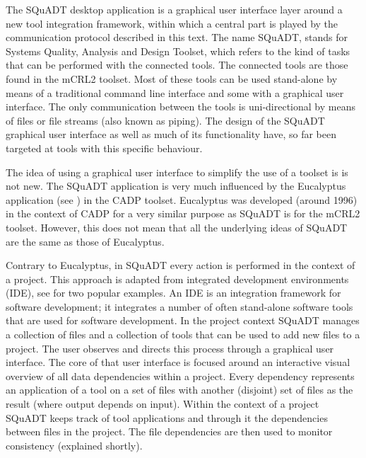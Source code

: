 \documentclass{article}
\newcommand{\squadt}{SQuADT\xspace}
\begin{document}
  The \squadt desktop application is a graphical user interface layer around a
  new tool integration framework, within which a central part is played by the
  communication protocol described in this text.  The name \squadt, stands for
  Systems Quality, Analysis and Design Toolset, which refers to the kind of
  tasks that can be performed with the connected tools. The connected tools are
  those found in the mCRL2 toolset. Most of these tools can be used
  stand-alone by means of a traditional command line interface and some with a
  graphical user interface.  The only communication between the tools is
  uni-directional by means of files or file streams (also known as piping). The
  design of the \squadt graphical user interface as well as much of its
  functionality have, so far been targeted at tools with this specific
  behaviour.

  The idea of using a graphical user interface to simplify the use of a toolset
  is is not new. The \squadt application is very much influenced by the
  Eucalyptus application (see \cite{CADP}) in the CADP toolset. Eucalyptus was
  developed (around 1996) in the context of CADP for a very similar purpose as
  \squadt is for the mCRL2 toolset. However, this does not mean that all the
  underlying ideas of \squadt are the same as those of Eucalyptus.


  Contrary to Eucalyptus, in \squadt every action is performed in the context
  of a project. This approach is adapted from integrated development
  environments (IDE), see \cite{Eclipse,NetBeans} for two popular examples.
  An IDE is an integration framework for software development; it integrates a
  number of often stand-alone software tools that are used for software
  development. In the project context \squadt manages a collection of files and
  a collection of tools that can be used to add new files to a project. The
  user observes and directs this process through a graphical user interface.
  The core of that user interface is focused around an interactive visual
  overview of all data dependencies within a project.  Every dependency
  represents an application of a tool on a set of files with another (disjoint)
  set of files as the result (where output depends on input).  Within the
  context of a project \squadt keeps track of tool applications and through it
  the dependencies between files in the project. The file dependencies are then
  used to monitor consistency (explained shortly).
\end{document}

